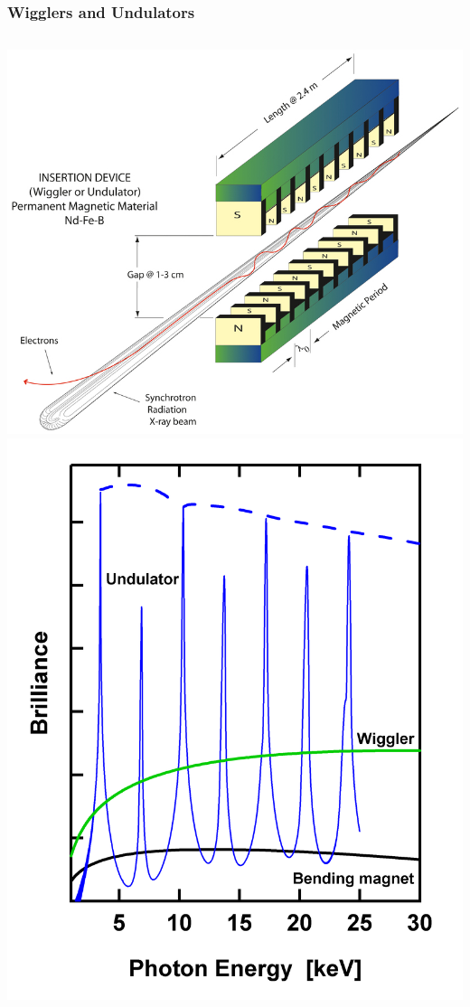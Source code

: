 \documentclass[10pt, xcolor=x11names, compress]{beamer}
\begin{document}
\begin{frame}
  \frametitle{Wigglers and Undulators}
  \begin{columns}
    \begin{column}{0.4\linewidth}
      \begin{center}
        \includegraphics[width=\linewidth]{synch/id.jpg}\\
        \includegraphics[width=0.7\linewidth]{synch/bm_id.png}
      \end{center}

\end{column}
\end{columns}
\end{frame}
\end{document}
